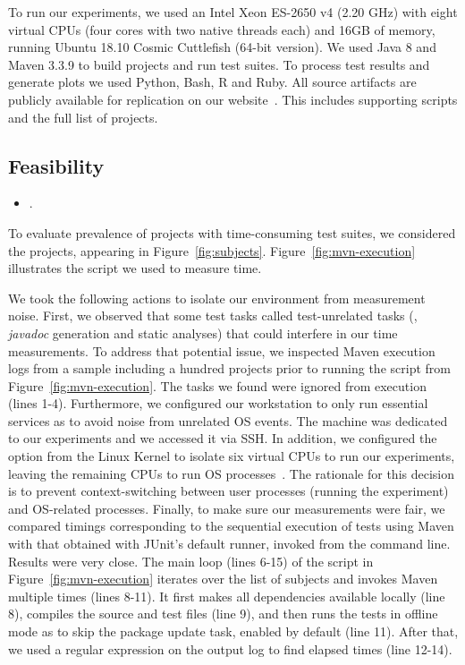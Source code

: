 \documentclass[10pt,journal,compsoc]{IEEEtran}
\begin{document}
To run our experiments, we used an Intel Xeon ES-2650 v4 (2.20 GHz)
with eight virtual CPUs (four cores with two native threads each) and
16GB of memory, running Ubuntu 18.10 Cosmic Cuttlefish (64-bit version).  We
used Java 8 and Maven 3.3.9 to build projects and run test
suites. To process test results and generate plots we used Python,
Bash, R and Ruby.  All source artifacts are publicly available for
replication on our website~\cite{ourwebpage}.  This includes supporting
scripts and the full list of projects.

\subsection{Feasibility}
\label{sec:rqA}
\label{sec:rqB}

\begin{itemize}
  \item \numRQFeasibilityOne{}. \textbf{\RQFeasibilityOne}
\end{itemize}


To evaluate prevalence of projects with time-consuming test suites, we
considered the \numSubjs{} projects, appearing in 
Figure~\ref{fig:subjects}.  Figure~\ref{fig:mvn-execution} illustrates
the script we used to measure time.

We took the following actions to isolate our environment from
measurement noise.
First, we observed that some test tasks called test-unrelated tasks
(\eg, \emph{javadoc} generation and static analyses) that could
interfere in our time measurements.
To address that potential issue, we inspected Maven execution logs
from a sample including a hundred projects prior to running the script
from Figure~\ref{fig:mvn-execution}.
The tasks we found were ignored from execution (lines 1-4).
Furthermore, we configured
our workstation to only run essential services as to avoid noise from unrelated OS events.
The machine was dedicated to our experiments and we
accessed it via SSH. In addition, we configured the 
option from the Linux Kernel \cite{linux-kernel} to isolate six
virtual CPUs to run our experiments, leaving the remaining CPUs to run
OS processes~\cite{isolcpus-use}.  The rationale for this decision is
to prevent context-switching between user processes (running the
experiment) and OS-related processes.  Finally, to make sure our
measurements were fair, we compared timings corresponding to the
sequential execution of tests using Maven with that obtained with
JUnit's default  runner, invoked from the command
line.  Results were very close.
The main loop (lines 6-15) of the script in
Figure~\ref{fig:mvn-execution} iterates over the list of subjects and
invokes Maven multiple times (lines 8-11).  It first makes all dependencies available locally
(line 8), compiles the source and test files (line 9), and then runs
the tests in offline mode as to skip the package update task, enabled
by default (line 11). After that, we used a regular expression on
the output log to find elapsed times (line 12-14).
\end{document}
